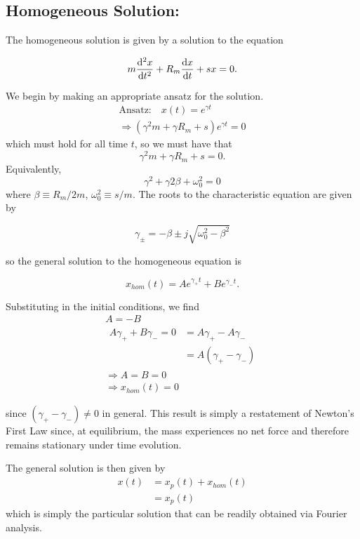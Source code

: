 \documentclass{article}
\begin{document}
\subsection*{Homogeneous Solution:}

The homogeneous solution is given by a solution to the equation

\[
m \dv[2]{x}{t} + R_m \dv{x}{t} + s x = 0.
\]

We begin by making an appropriate ansatz for the solution.
\begin{gather*}
  \text{Ansatz:}\quad x(t) = e^{\gamma t}
  \\
  \Rightarrow (\gamma^2 m + \gamma R_m + s) e^{\gamma t} = 0
\end{gather*}
which must hold for all time $t$, so we must have that
\[
\gamma^2 m + \gamma R_m + s = 0.
\]
Equivalently,
\[
  \gamma^2 + \gamma 2 \beta + \omega_{0}^2 = 0
\]
where $\beta \equiv R_m / 2m$, $\omega_{0}^2 \equiv s/m$. The roots to the characteristic equation are given by

\[
 \gamma_{\pm} = - \beta \pm  j \sqrt{\omega_{0}^2 - \beta ^2}
\]

so the general solution to the homogeneous equation is

\[
  x_{hom}(t) = A e^{\gamma_+ t} + B e^{\gamma_- t}.
\]

Substituting in the initial conditions, we find
\begin{gather*}
  A = -B
  \\
  \begin{split}
    A \gamma_+ + B \gamma_- = 0 &=  A \gamma_+ - A \gamma_-
    \\
    &= A(\gamma_+ - \gamma_-)
  \end{split}
  \\
  \Rightarrow A = B = 0
  \\
  \boxed{ \Rightarrow x_{hom}(t) = 0 }
\end{gather*}

since $(\gamma_+ - \gamma_-) \neq 0$ in general. This result is simply a restatement of Newton's First Law
since, at equilibrium, the mass experiences no net force and therefore remains stationary under time evolution.

The general solution is then given by
\[
  \begin{split}
    x(t) &= x_{p}(t) + x_{hom}(t) \\
         &= x_p(t)
  \end{split}
\]
which is simply the particular solution that can be readily obtained via Fourier analysis.
\end{document}

